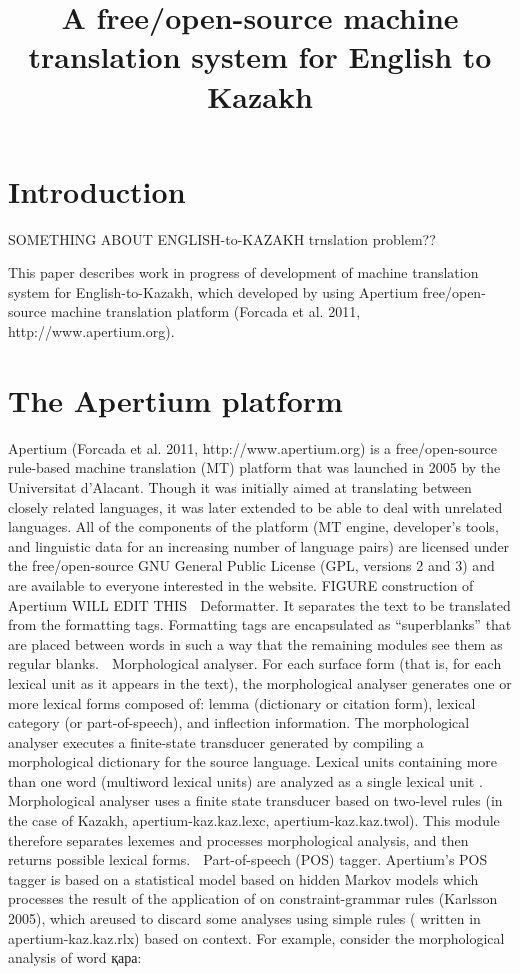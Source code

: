 \documentclass[a4paper,twocolumn,11pt]{article}
\title{A free/open-source machine translation system for English to Kazakh}
\begin{document}
\section{Introduction}

SOMETHING ABOUT ENGLISH-to-KAZAKH trnslation problem??

This paper describes work in progress of development of machine translation system for English-to-Kazakh, which developed by using Apertium free/open-source machine translation platform (Forcada et al. 2011, http://www.apertium.org). 

\section{The Apertium platform}
Apertium (Forcada et al. 2011, http://www.apertium.org) is a free/open-source rule-based machine translation (MT) platform that was launched in 2005 by the Universitat d’Alacant. Though it was initially aimed at translating between closely related languages, it was later extended to be able to deal with unrelated languages. All of the components of the platform (MT engine, developer’s tools, and linguistic data for an increasing number of language pairs) are licensed under the free/open-source GNU General Public License (GPL, versions 2 and 3) and are available to everyone interested in the website.
FIGURE construction of Apertium
WILL EDIT THIS
	Deformatter. It separates the text to be translated from the formatting tags. Formatting tags are encapsulated as “superblanks” that are placed between words in such a way that the remaining modules see them as regular blanks.
	Morphological analyser. For each surface form (that is, for each lexical unit as it appears in the text), the morphological analyser generates one or more lexical forms composed of: lemma (dictionary or citation form), lexical category (or part-of-speech), and inflection information. The morphological analyser executes a finite-state transducer generated by compiling a morphological dictionary for the source language. Lexical units containing more than one word (multiword lexical units) are analyzed as a single lexical unit .   Morphological analyser uses a finite state transducer based on two-level rules (in the case of Kazakh, apertium-kaz.kaz.lexc, apertium-kaz.kaz.twol). This module therefore separates lexemes and processes morphological analysis, and then returns possible lexical forms.
	Part-of-speech (POS) tagger. Apertium's POS tagger is based on a statistical model based on hidden Markov models which processes the result of the application of  on constraint-grammar rules (Karlsson 2005), which areused to discard some analyses  using simple rules ( written in apertium-kaz.kaz.rlx) based on context. For example, consider the morphological analysis of word қара:
\end{document}

